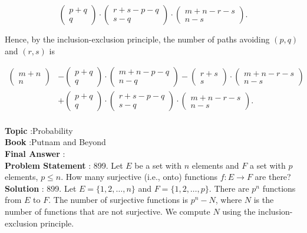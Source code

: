 \documentclass[10pt]{article}
\begin{document}
$$
\left(\begin{array}{c}
p+q \\
q
\end{array}\right) \cdot\left(\begin{array}{c}
r+s-p-q \\
s-q
\end{array}\right) \cdot\left(\begin{array}{c}
m+n-r-s \\
n-s
\end{array}\right) .
$$

Hence, by the inclusion-exclusion principle, the number of paths avoiding $(p, q)$ and $(r, s)$ is

$$
\begin{aligned}
\left(\begin{array}{c}
m+n \\
n
\end{array}\right) &-\left(\begin{array}{c}
p+q \\
q
\end{array}\right) \cdot\left(\begin{array}{c}
m+n-p-q \\
n-q
\end{array}\right)-\left(\begin{array}{c}
r+s \\
s
\end{array}\right) \cdot\left(\begin{array}{c}
m+n-r-s \\
n-s
\end{array}\right) \\
&+\left(\begin{array}{c}
p+q \\
q
\end{array}\right) \cdot\left(\begin{array}{c}
r+s-p-q \\
s-q
\end{array}\right) \cdot\left(\begin{array}{c}
m+n-r-s \\
n-s
\end{array}\right) .
\end{aligned}
$$
\\
\textbf{Topic} :Probability\\
\textbf{Book} :Putnam and Beyond\\
\textbf{Final Answer} :\\


\textbf{Problem Statement} :
899. Let $E$ be a set with $n$ elements and $F$ a set with $p$ elements, $p \leq n$. How many surjective (i.e., onto) functions $f: E \rightarrow F$ are there?
\\
\textbf{Solution} :
899. Let $E=\{1,2, \ldots, n\}$ and $F=\{1,2, \ldots, p\}$. There are $p^{n}$ functions from $E$ to $F$. The number of surjective functions is $p^{n}-N$, where $N$ is the number of functions that are not surjective. We compute $N$ using the inclusion-exclusion principle.
\end{document}
